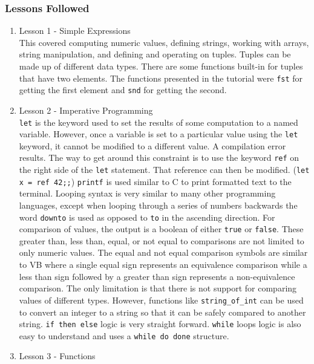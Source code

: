 \subsubsection{Lessons Followed}

\begin{enumerate}
\item Lesson 1 - Simple Expressions \\
  This covered computing numeric values, defining strings, working with arrays, string manipulation, and defining and operating on tuples. Tuples can be made up of different data types. There are some functions built-in for tuples that have two elements. The functions presented in the tutorial were \texttt{fst} for getting the first element and \texttt{snd} for getting the second.

\item Lesson 2 - Imperative Programming \\
  \texttt{let} is the keyword used to set the results of some computation to a named variable. However, once a variable is set to a particular value using the \texttt{let} keyword, it cannot be modified to a different value. A compilation error results. The way to get around this constraint is to use the keyword \texttt{ref} on the right side of the \texttt{let} statement. That reference can then be modified. (\texttt{let x = ref 42;;}) 
  \texttt{printf} is used similar to C to print formatted text to the terminal. 
  Looping syntax is very similar to many other programming languages, except when looping through a series of numbers backwards the word \texttt{downto} is used as opposed to \texttt{to} in the ascending direction. 
  For comparison of values, the output is a boolean of either \texttt{true} or \texttt{false}. These greater than, less than, equal, or not equal to comparisons are not limited to only numeric values. The equal and not equal comparison symbols are similar to VB where a single equal sign represents an equivalence comparison while a less than sign followed by a greater than sign represents a non-equivalence comparison. The only limitation is that there is not support for comparing values of different types. However, functions like \verb|string_of_int| can be used to convert an integer to a string so that it can be safely compared to another string. 
  \texttt{if then else} logic is very straight forward. 
  \texttt{while} loops logic is also easy to understand and uses a \texttt{while do done} structure.
\item Lesson 3 - Functions \\

\end{enumerate}
